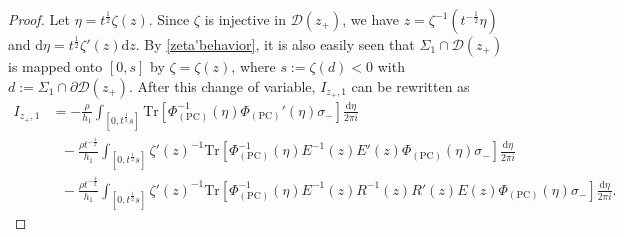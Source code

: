 \documentclass[11pt,a4paper]{article}
\newcommand{\dd}{\mathrm{d}}
\numberwithin{equation}{section}
\begin{document}
\begin{proof}
Let $\eta=t^{\frac{1}{2}}\zeta(z)$. Since $\zeta$ is injective in $\mathcal D(z_+)$, we have $z=\zeta^{-1}(t^{-\frac{1}{2}}\eta)$ and $\dd \eta=t^{\frac{1}{2}}\zeta'(z)\dd z$. By \eqref{zeta'behavior}, it is also easily seen that $\Sigma_1 \cap \mathcal D(z_+)$ is mapped onto $[0,s]$ by $\zeta=\zeta(z)$, where $s:=\zeta(d)<0$ with $d:=\Sigma_1\cap\partial\mathcal{D}(z_+)$. After this change of variable, $I_{z_+,1}$ can be rewritten as
\begin{align}
I_{z_+,1}&=-\frac{\rho}{h_1}\int_{[0,t^{\frac{1}{2}}s]}
\mathrm{Tr}\left[\Phi_{(\mathrm{PC})}^{-1}(\eta)\Phi_{(\mathrm{PC})}'(\eta)
\sigma_-\right]\frac{\mathrm{d}\eta}{2\pi i}\nonumber \\
&~~~-\frac{\rho t^{-\frac{1}{2}}}{h_1}\int_{[0,t^{\frac{1}{2}}s]}\zeta'(z)^{-1}
\mathrm{Tr}\left[\Phi_{(\mathrm{PC})}^{-1}(\eta)E^{-1}(z)E'(z)\Phi_{(\mathrm{PC})}(\eta)
\sigma_-\right]\frac{\mathrm{d}\eta}{2\pi i}\nonumber \\
&~~~-\frac{\rho t^{-\frac{1}{2}}}{h_1}\int_{[0,t^{\frac{1}{2}}s]}\zeta'(z)^{-1}
\mathrm{Tr}\left[\Phi_{(\mathrm{PC})}^{-1}(\eta)E^{-1}(z)R^{-1}(z)R'(z)E(z)
\Phi_{(\mathrm{PC})}(\eta)\sigma_-\right]\frac{\mathrm{d}\eta}{2\pi i}. \label{eq:Iz+1est1}
\end{align}


\end{proof}
\end{document}
